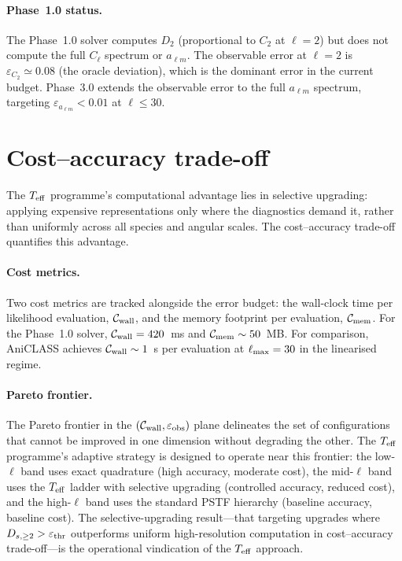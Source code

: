 \paragraph{Phase~1.0 status.}

The Phase~1.0 solver computes $D_2$ (proportional to
$C_2$ at $\ell = 2$) but does not compute the full
$C_\ell$ spectrum or $a_{\ell m}$.  The observable
error at $\ell = 2$ is $\varepsilon_{C_2} \simeq 0.08$
(the oracle deviation), which is the dominant error in
the current budget.  Phase~3.0 extends the observable
error to the full $a_{\ell m}$ spectrum, targeting
$\varepsilon_{a_{\ell m}} < 0.01$ at $\ell \leq 30$.


\section{Cost--accuracy trade-off}
\label{sec:err-cost}

The $T_{\mathrm{eff}}$ programme's computational advantage lies in
selective upgrading: applying expensive representations
only where the diagnostics demand it, rather than
uniformly across all species and angular scales.  The
cost--accuracy trade-off quantifies this advantage.


\paragraph{Cost metrics.}

Two cost metrics are tracked alongside the error budget:
the wall-clock time per likelihood evaluation,
$\mathcal{C}_{\rm wall}$, and the memory footprint per
evaluation, $\mathcal{C}_{\rm mem}$.  For the Phase~1.0
solver, $\mathcal{C}_{\rm wall} = 420$~ms and
$\mathcal{C}_{\rm mem} \sim 50$~MB.  For comparison,
AniCLASS achieves $\mathcal{C}_{\rm wall} \sim 1$~s per
evaluation at $\ell_{\rm max} = 30$ in the linearised
regime.


\paragraph{Pareto frontier.}

The Pareto frontier in the
$(\mathcal{C}_{\rm wall}, \varepsilon_{\rm obs})$ plane
delineates the set of configurations that cannot be
improved in one dimension without degrading the other.
The $T_{\mathrm{eff}}$ programme's adaptive strategy is designed to
operate near this frontier: the low-$\ell$ band uses
exact quadrature (high accuracy, moderate cost), the
mid-$\ell$ band uses the $T_{\mathrm{eff}}$ ladder with selective
upgrading (controlled accuracy, reduced cost), and the
high-$\ell$ band uses the standard PSTF hierarchy
(baseline accuracy, baseline cost).  The selective-upgrading
result---that targeting upgrades where
$D_{s,\geq 2} > \varepsilon_{\rm thr}$ outperforms
uniform high-resolution computation in cost--accuracy
trade-off---is the operational vindication of the $T_{\mathrm{eff}}$
approach.

